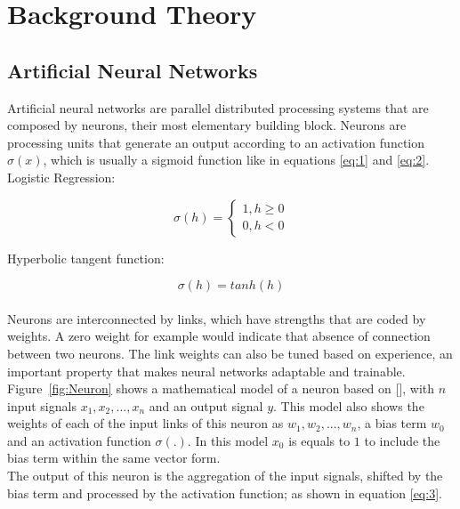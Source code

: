 
\chapter{Background Theory} %

\label{Chapter1} %


\newcommand{\keyword}[1]{\textbf{#1}}
\newcommand{\tabhead}[1]{\textbf{#1}}
\newcommand{\code}[1]{\texttt{#1}}
\newcommand{\file}[1]{\texttt{\bfseries#1}}
\newcommand{\option}[1]{\texttt{\itshape#1}}


\section{Artificial Neural Networks}
Artificial neural networks are parallel distributed processing systems that are composed by  neurons, their most elementary building block. Neurons are processing  units that generate an output according to an activation function $\sigma(x)$, which is usually a sigmoid function like in equations \ref{eq:1} and \ref{eq:2}.\\

Logistic Regression: 

\begin{equation}\label{eq:1}
\sigma(h)= \left\{
			 \begin{array}{ll}
			 	1, h\geq0\\
			 	0, h<0
			\end{array}
		 \right.
\end{equation}


Hyperbolic tangent function:

\begin{equation}\label{eq:2}
\sigma(h)=tanh(h)
\end{equation}
\\

Neurons are interconnected by links, which have strengths that are coded by weights. A zero weight for example would indicate that absence of connection between two neurons. The link weights can also be tuned based on experience, an important property that makes neural networks adaptable and trainable. 
\\
Figure~\ref{fig:Neuron} shows a mathematical model of a neuron based on [\cite{Reference2}], with $n$ input signals $x_1, x_2, ..., x_{n}$ and an output signal $y$. This model also shows the weights of each of the input links of this neuron as $w_1, w_2,...,w_{n} $, a bias term $w_0$ and an activation function $\sigma(.)$. In this model $x_0$ is equals to $1$ to include the bias term within the same vector form. 
\\
The output of this neuron is the aggregation of the input signals, shifted by the bias term and processed by the activation function; as shown in equation \ref{eq:3}.

